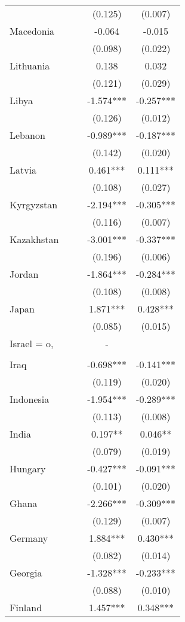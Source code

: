 \documentclass[]{article}
\begin{document}
\begin{tabular}{lcccc}
 &  &  & (0.125) & (0.007) \\
Macedonia &  &  & -0.064 & -0.015 \\
 &  &  & (0.098) & (0.022) \\
Lithuania &  &  & 0.138 & 0.032 \\
 &  &  & (0.121) & (0.029) \\
Libya &  &  & -1.574*** & -0.257*** \\
 &  &  & (0.126) & (0.012) \\
Lebanon &  &  & -0.989*** & -0.187*** \\
 &  &  & (0.142) & (0.020) \\
Latvia &  &  & 0.461*** & 0.111*** \\
 &  &  & (0.108) & (0.027) \\
Kyrgyzstan &  &  & -2.194*** & -0.305*** \\
 &  &  & (0.116) & (0.007) \\
Kazakhstan &  &  & -3.001*** & -0.337*** \\
 &  &  & (0.196) & (0.006) \\
Jordan &  &  & -1.864*** & -0.284*** \\
 &  &  & (0.108) & (0.008) \\
Japan &  &  & 1.871*** & 0.428*** \\
 &  &  & (0.085) & (0.015) \\
Israel = o, &  &  & - &  \\
 &  &  &  &  \\
Iraq &  &  & -0.698*** & -0.141*** \\
 &  &  & (0.119) & (0.020) \\
Indonesia &  &  & -1.954*** & -0.289*** \\
 &  &  & (0.113) & (0.008) \\
India &  &  & 0.197** & 0.046** \\
 &  &  & (0.079) & (0.019) \\
Hungary &  &  & -0.427*** & -0.091*** \\
 &  &  & (0.101) & (0.020) \\
Ghana &  &  & -2.266*** & -0.309*** \\
 &  &  & (0.129) & (0.007) \\
Germany &  &  & 1.884*** & 0.430*** \\
 &  &  & (0.082) & (0.014) \\
Georgia &  &  & -1.328*** & -0.233*** \\
 &  &  & (0.088) & (0.010) \\
Finland &  &  & 1.457*** & 0.348*** \\

\end{tabular}
\end{document}
